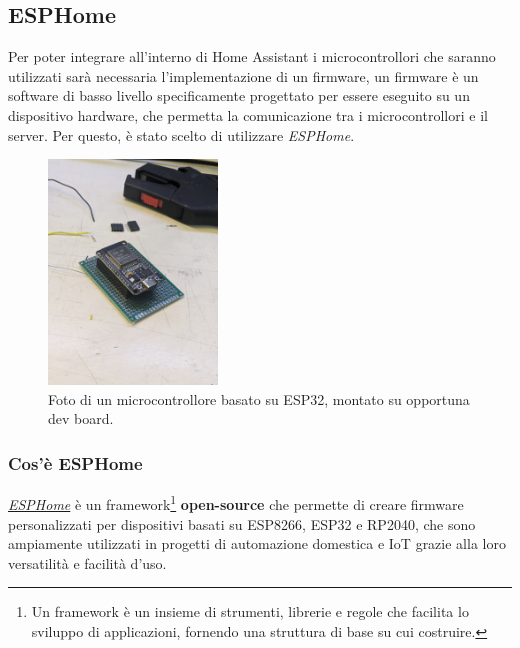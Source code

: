 \documentclass[11pt, a4paper]{article}
\begin{document}
\subsection{ESPHome}

Per poter integrare all'interno di Home Assistant i microcontrollori che saranno utilizzati sarà necessaria
l'implementazione di un 
firmware, un firmware è un software di basso livello specificamente progettato per essere eseguito su un dispositivo hardware,
che permetta la comunicazione tra i microcontrollori e il server.
Per questo, è stato scelto di utilizzare \textit{ESPHome}.

\begin{figure}[h!]
    \centering
    \includegraphics[width=0.4\textwidth]{media/mio-esp-32.jpg}
    \caption{Foto di un microcontrollore basato su ESP32, montato su opportuna dev board.}
    \label{fig:esphome-dashboard}
\end{figure}

\subsubsection{Cos'è ESPHome}
\href{https://esphome.io}{\textit{ESPHome}} è un 
framework\footnote{Un framework è un insieme di strumenti, librerie e regole che facilita 
lo sviluppo di applicazioni, fornendo una struttura di base su cui costruire.} 
\textbf{open-source} che permette di 
creare firmware personalizzati per dispositivi basati su ESP8266, ESP32 e RP2040,
che sono ampiamente utilizzati in progetti di automazione domestica e IoT grazie alla loro versatilità e facilità d'uso.
\end{document}
